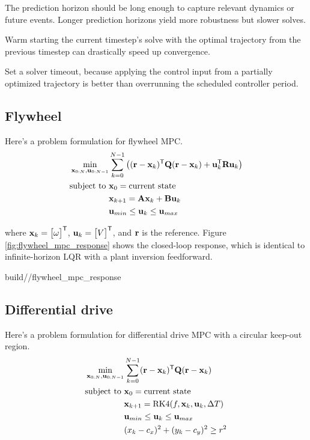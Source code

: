 The prediction horizon should be long enough to capture relevant dynamics or
future events. Longer prediction horizons yield more robustness but slower
solves.

Warm starting the current timestep's solve with the optimal trajectory from the
previous timestep can drastically speed up convergence.

Set a solver timeout, because applying the control input from a partially
optimized trajectory is better than overrunning the scheduled controller period.

\subsection{Flywheel}

Here's a problem formulation for flywheel MPC.
\begin{align*}
  \min_{\mathbf{x}_{0:N}, \mathbf{u}_{0:N-1}}
    &\sum_{k=0}^{N-1} \left((\mathbf{r} - \mathbf{x}_k)^\mathsf{T}\mathbf{Q}(\mathbf{r} - \mathbf{x}_k) + \mathbf{u}_k^\mathsf{T}\mathbf{R}\mathbf{u}_k\right) \\
  \text{subject to } &\mathbf{x}_0 = \text{current state} \\
                     &\mathbf{x}_{k+1} = \mathbf{A}\mathbf{x}_k + \mathbf{B}\mathbf{u}_k \\
                     &\mathbf{u}_{min} \leq \mathbf{u}_k \leq \mathbf{u}_{max}
\end{align*}

where $\mathbf{x}_k = \begin{bmatrix}\omega\end{bmatrix}^\mathsf{T}$,
$\mathbf{u}_k = \begin{bmatrix}V\end{bmatrix}^\mathsf{T}$, and $\mathbf{r}$ is the reference.
Figure \ref{fig:flywheel_mpc_response} shows the closed-loop response, which is
identical to infinite-horizon LQR with a plant inversion feedforward.
\begin{svg}{build/\chapterpath/flywheel_mpc_response}
  \caption{Flywheel MPC response}
  \label{fig:flywheel_mpc_response}
\end{svg}

\subsection{Differential drive}

Here's a problem formulation for differential drive MPC with a circular keep-out
region.
\begin{align*}
  \min_{\mathbf{x}_{0:N}, \mathbf{u}_{0:N-1}}
    &\sum_{k=0}^{N-1} (\mathbf{r} - \mathbf{x}_k)^\mathsf{T}\mathbf{Q}(\mathbf{r} - \mathbf{x}_k) \\
  \text{subject to } &\mathbf{x}_0 = \text{current state} \\
                     &\mathbf{x}_{k+1} = \text{RK4}(f, \mathbf{x}_k, \mathbf{u}_k, \Delta T) \\
                     &\mathbf{u}_{min} \leq \mathbf{u}_k \leq \mathbf{u}_{max} \\
                     &(x_k - c_x)^2 + (y_k - c_y)^2 \geq r^2
\end{align*}


